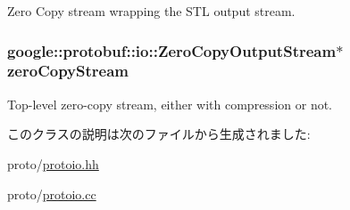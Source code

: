 Zero Copy stream wrapping the STL output stream. \hypertarget{classProtoOutputStream_a9d032f60609c0513069efc5003f21840}{
\subsubsection[{zeroCopyStream}]{\setlength{\rightskip}{0pt plus 5cm}google::protobuf::io::ZeroCopyOutputStream$\ast$ {\bf zeroCopyStream}}}
\label{classProtoOutputStream_a9d032f60609c0513069efc5003f21840}


Top-\/level zero-\/copy stream, either with compression or not. 

このクラスの説明は次のファイルから生成されました:\begin{DoxyCompactItemize}
\item 
proto/\hyperlink{protoio_8hh}{protoio.hh}\item 
proto/\hyperlink{protoio_8cc}{protoio.cc}\end{DoxyCompactItemize}
